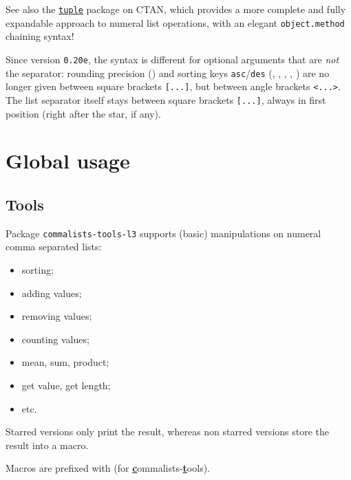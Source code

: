 \documentclass[11pt,a4paper]{ltxdoc}
\begin{document}
{\footnotesize\faLightbulb} See also the \href{https://ctan.org/pkg/tuple}{\texttt{tuple}} package on CTAN, which provides a more complete and fully expandable approach to numeral list operations, with an elegant \texttt{object.method} chaining syntax!

\smallskip

{\footnotesize\faBomb} Since version \texttt{0.20e}, the syntax is different for optional arguments that are \emph{not} the separator: rounding precision
(\ShowCode{\\cttransformlist}) and sorting keys \texttt{asc}/\texttt{des}
(\ShowCode{\\ctuniqlist}, \ShowCode{\\ctintersectlists}, \ShowCode{\\ctmergelists},
\ShowCode{\\ctdifflist}, \ShowCode{\\ctsymdifflist}) are no longer given between
square brackets \texttt{[...]}, but between angle brackets \texttt{<...>}. The
list separator itself stays between square brackets \texttt{[...]}, always in
first position (right after the star, if any).

\section{Global usage}

\subsection{Tools}

Package \texttt{commalists-tools-l3} supports (basic) manipulations on numeral comma separated lists:

\begin{itemize}
	\item sorting;
	\item adding values;
	\item removing values;
	\item counting values;
	\item mean, sum, product;
	\item get value, get length;
	\item etc.
\end{itemize}

Starred versions only print the result, whereas non starred versions store the result into a macro.

\medskip

{\small\faLightbulb} Macros are prefixed with  (for \textsf{\textbf{\underline{c}}ommalists-\textbf{\underline{t}}ools}).
\end{document}
